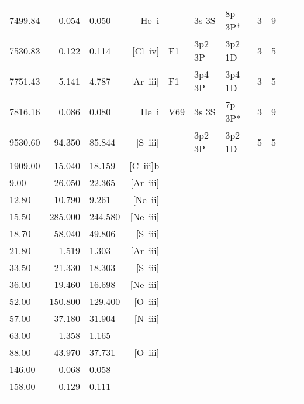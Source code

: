 \begin{longtable}{lrlrlllllll}
 7499.84 &   0.054 &   0.050 &  He~{\sc i}      &            &  3s 3S     &  8p 3P*    &          3 &        9    \\
 7530.83 &   0.122 &   0.114 &  [Cl~{\sc iv}]   &  F1        &  3p2 3P    &  3p2 1D    &          3 &        5    \\
 7751.43 &   5.141 &   4.787 &  [Ar~{\sc iii}]  &  F1        &  3p4 3P    &  3p4 1D    &          3 &        5    \\
 7816.16 &   0.086 &   0.080 &  He~{\sc i}      &  V69       &  3s 3S     &  7p 3P*    &          3 &        9    \\
 9530.60 &  94.350 &  85.844 & [S~{\sc iii}]    &            & 3p2 3P     & 3p2 1D     &          5 &        5    \\
 1909.00 &  15.040 &  18.159 & [C~{\sc iii}]b                                                                     \\
    9.00 &  26.050 &  22.365 & [Ar~{\sc iii}]                                                                     \\
   12.80 &  10.790 &   9.261 & [Ne~{\sc ii}]                                                                      \\
   15.50 & 285.000 & 244.580 & [Ne~{\sc iii}]                                                                     \\
   18.70 &  58.040 &  49.806 & [S~{\sc iii}]                                                                      \\
   21.80 &   1.519 &   1.303 & [Ar~{\sc iii}]                                                                     \\
   33.50 &  21.330 &  18.303 & [S~{\sc iii}]                                                                      \\
   36.00 &  19.460 &  16.698 & [Ne~{\sc iii}]                                                                     \\
   52.00 & 150.800 & 129.400 & [O~{\sc iii}]                                                                      \\
   57.00 &  37.180 &  31.904 & [N~{\sc iii}]                                                                      \\
   63.00 &   1.358 &   1.165                                                                                      \\
   88.00 &  43.970 &  37.731 & [O~{\sc iii}]                                                                      \\
  146.00 &   0.068 &   0.058                                                                                      \\
  158.00 &   0.129 &   0.111                                                                                      \\
 \hline
 \label{tab:/home/hmonteiro/Dropbox/work/devel/Neat_2d/neat-1.7/examples/ngc6543.dat_linelist}
 \end{longtable}
